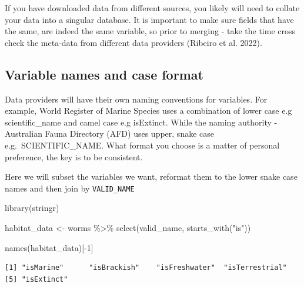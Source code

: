 \documentclass[
  letterpaper,
  DIV=11,
  numbers=noendperiod,
  oneside]{scrreprt}
\newenvironment{Shaded}{\begin{snugshade}}{\end{snugshade}}
\newcommand{\DecValTok}[1]{\textcolor[rgb]{0.68,0.00,0.00}{#1}}
\newcommand{\FunctionTok}[1]{\textcolor[rgb]{0.28,0.35,0.67}{#1}}
\newcommand{\NormalTok}[1]{\textcolor[rgb]{0.00,0.23,0.31}{#1}}
\newcommand{\OtherTok}[1]{\textcolor[rgb]{0.00,0.23,0.31}{#1}}
\newcommand{\SpecialCharTok}[1]{\textcolor[rgb]{0.37,0.37,0.37}{#1}}
\newcommand{\StringTok}[1]{\textcolor[rgb]{0.13,0.47,0.30}{#1}}
\begin{document}
If you have downloaded data from different sources, you likely will need
to collate your data into a singular database. It is important to make
sure fields that have the same, are indeed the same variable, so prior
to merging - take the time cross check the meta-data from different data
providers (Ribeiro et al. 2022).

\hypertarget{variable-names-and-case-format}{%
\subsection{Variable names and case
format}\label{variable-names-and-case-format}}

Data providers will have their own naming conventions for variables. For
example, World Register of Marine Species uses a combination of lower
case e.g scientific\_name and camel case e.g isExtinct. While the naming
authority - Australian Fauna Directory (AFD) uses upper, snake case
e.g.~SCIENTIFIC\_NAME. What format you choose is a matter of personal
preference, the key is to be consistent.

Here we will subset the variables we want, reformat them to the lower
snake case names and then join by \texttt{VALID\_NAME}

\begin{Shaded}
\begin{Highlighting}[]
\FunctionTok{library}\NormalTok{(stringr)}

\NormalTok{habitat\_data }\OtherTok{\textless{}{-}}\NormalTok{ worms }\SpecialCharTok{\%\textgreater{}\%} 
  \FunctionTok{select}\NormalTok{(valid\_name, }\FunctionTok{starts\_with}\NormalTok{(}\StringTok{"is"}\NormalTok{)) }

\FunctionTok{names}\NormalTok{(habitat\_data)[}\SpecialCharTok{{-}}\DecValTok{1}\NormalTok{] }
\end{Highlighting}
\end{Shaded}

\begin{verbatim}
[1] "isMarine"      "isBrackish"    "isFreshwater"  "isTerrestrial"
[5] "isExtinct"    
\end{verbatim}
\end{document}
